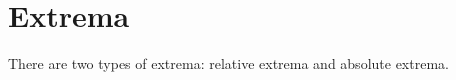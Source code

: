 %
%
%
%
%
%
%
%


\section{Extrema}



There are two types of extrema: relative extrema and absolute extrema.


